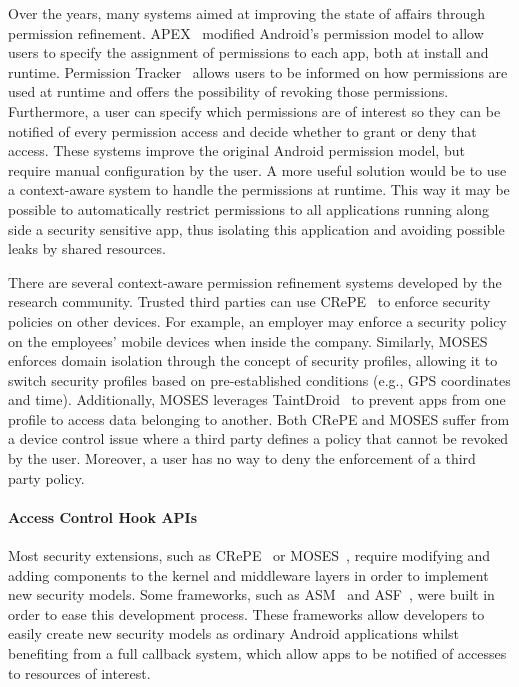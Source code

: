 Over the years, many systems aimed at improving the state of affairs through permission refinement. APEX~\cite{nauman2010apex} modified Android's permission model to allow users to specify the assignment of permissions to each app, both at install and runtime. Permission Tracker~\cite{kern2012permission} allows users to be informed on how permissions are used at runtime and offers the possibility of revoking those permissions. Furthermore, a user can specify which permissions are of interest so they can be notified of every permission access and decide whether to grant or deny that access. These systems improve the original Android permission model, but require manual configuration by the user. %
A more useful solution would be to use a context-aware system to handle the permissions at runtime. This way it may be possible to automatically restrict permissions to all applications running along side a security sensitive app, thus isolating this application and avoiding possible leaks by shared resources.

There are several context-aware permission refinement systems developed by the research community. Trusted third parties can use CRePE~\cite{conti2011crepe} to enforce security policies on other devices. For example, an employer may enforce a security policy on the employees' mobile devices when inside the company. Similarly, MOSES~\cite{russello2012moses} enforces domain isolation through the concept of security profiles, allowing it to switch security profiles based on pre-established conditions (e.g., GPS coordinates and time). Additionally, MOSES leverages TaintDroid~\cite{enck2014taintdroid} to prevent apps from one profile to access data belonging to another. Both CRePE and MOSES suffer from a device control issue where a third party defines a policy that cannot be revoked by the user. Moreover, a user has no way to deny the enforcement of a third party policy. 

\paragraph{\textbf{Access Control Hook APIs}}

Most security extensions, such as CRePE~\cite{conti2011crepe} or MOSES~\cite{russello2012moses}, require modifying and adding components to the kernel and middleware layers in order to implement new security models. Some frameworks, such as \ac{ASM}~\cite{heuser2014asm} and \ac{ASF}~\cite{backes2014android}, were built in order to ease this development process. These frameworks allow developers to easily create new security models as ordinary Android applications whilst benefiting from a full callback system, which allow apps to be notified of accesses to resources of interest.

